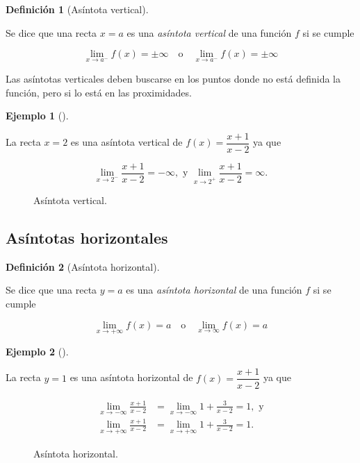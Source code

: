 \documentclass[
  a4paper,
]{scrreport}
\theoremstyle{definition}
\newtheorem{example}{Ejemplo}[chapter]
\theoremstyle{plain}
\theoremstyle{definition}
\newtheorem{definition}{Definición}[chapter]
\theoremstyle{definition}
\theoremstyle{plain}
\theoremstyle{plain}
\theoremstyle{remark}
\begin{document}
\begin{definition}[Asíntota
vertical]\protect\hypertarget{def-asintota-vertical}{}\label{def-asintota-vertical}

Se dice que una recta \(x=a\) es una \emph{asíntota vertical} de una
función \(f\) si se cumple

\[\lim_{x\to a^-}f(x)=\pm \infty \quad \mbox{o} \quad \lim_{x\to a^-}f(x)=\pm \infty\]

\end{definition}

Las asíntotas verticales deben buscarse en los puntos donde no está
definida la función, pero si lo está en las proximidades.

\begin{example}[]\protect\hypertarget{exm-asintota-vertical}{}\label{exm-asintota-vertical}

La recta \(x=2\) es una asíntota vertical de \(f(x)=\dfrac{x+1}{x-2}\)
ya que

\[\lim_{x\to 2^-}\frac{x+1}{x-2} =-\infty, \mbox{ y } \lim_{x\to 2^+}\frac{x+1}{x-2} =\infty.\]

\begin{figure}
\centering

\caption{Asíntota vertical.}
\end{figure}

\end{example}

\subsection{Asíntotas horizontales}\label{asuxedntotas-horizontales}

\begin{definition}[Asíntota
horizontal]\protect\hypertarget{def-asintota-horizontal}{}\label{def-asintota-horizontal}

Se dice que una recta \(y=a\) es una \emph{asíntota horizontal} de una
función \(f\) si se cumple

\[\lim_{x\to +\infty}f(x)=a \quad \mbox{o} \quad \lim_{x\to \infty}f(x)=a\]

\end{definition}

\begin{example}[]\protect\hypertarget{exm-asintota-horizontal}{}\label{exm-asintota-horizontal}

La recta \(y=1\) es una asíntota horizontal de \(f(x)=\dfrac{x+1}{x-2}\)
ya que

\begin{align*}
\lim_{x\to -\infty}\frac{x+1}{x-2}&= \lim_{x\to -\infty}1+\frac{3}{x-2} = 1, \mbox{ y}\\
\lim_{x\to +\infty}\frac{x+1}{x-2}&= \lim_{x\to +\infty}1+\frac{3}{x-2} = 1.
\end{align*}

\begin{figure}
\centering

\caption{Asíntota horizontal.}
\end{figure}

\end{example}
\end{document}
